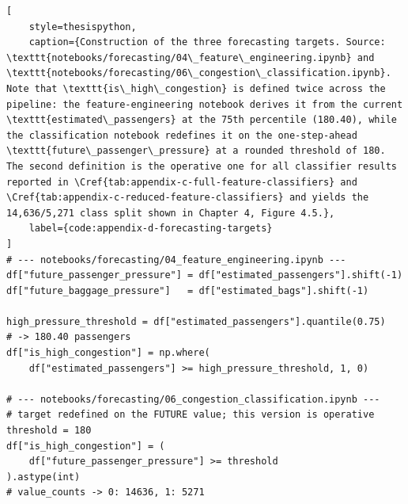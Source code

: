 \begin{lstlisting}[
    style=thesispython,
    caption={Construction of the three forecasting targets. Source: \texttt{notebooks/forecasting/04\_feature\_engineering.ipynb} and \texttt{notebooks/forecasting/06\_congestion\_classification.ipynb}. Note that \texttt{is\_high\_congestion} is defined twice across the pipeline: the feature-engineering notebook derives it from the current \texttt{estimated\_passengers} at the 75th percentile (180.40), while the classification notebook redefines it on the one-step-ahead \texttt{future\_passenger\_pressure} at a rounded threshold of 180. The second definition is the operative one for all classifier results reported in \Cref{tab:appendix-c-full-feature-classifiers} and \Cref{tab:appendix-c-reduced-feature-classifiers} and yields the 14,636/5,271 class split shown in Chapter 4, Figure 4.5.},
    label={code:appendix-d-forecasting-targets}
]
# --- notebooks/forecasting/04_feature_engineering.ipynb ---
df["future_passenger_pressure"] = df["estimated_passengers"].shift(-1)
df["future_baggage_pressure"]   = df["estimated_bags"].shift(-1)

high_pressure_threshold = df["estimated_passengers"].quantile(0.75)
# -> 180.40 passengers
df["is_high_congestion"] = np.where(
    df["estimated_passengers"] >= high_pressure_threshold, 1, 0)

# --- notebooks/forecasting/06_congestion_classification.ipynb ---
# target redefined on the FUTURE value; this version is operative
threshold = 180
df["is_high_congestion"] = (
    df["future_passenger_pressure"] >= threshold
).astype(int)
# value_counts -> 0: 14636, 1: 5271
\end{lstlisting}

